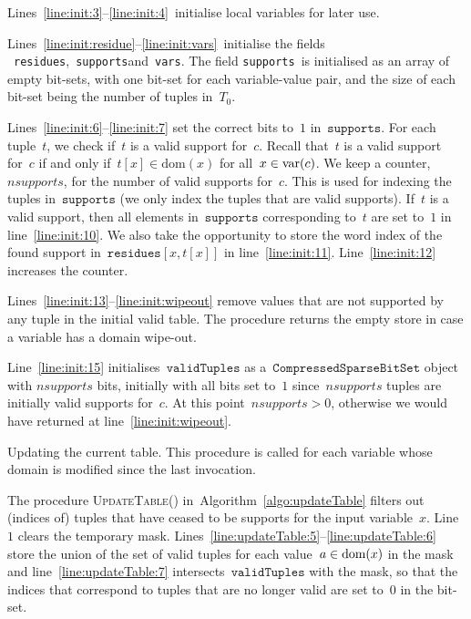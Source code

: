 \documentclass[a4paper,11pt]{article}
\theoremstyle{definition}
\newcommand{\Algoref}[1]{Algorithm~\ref{#1}}
\newcommand{\Lineref}[1]{Line~\ref{#1}}
\newcommand{\Linesref}[2]{Lines~\ref{#1}--\ref{#2}}
\newcommand{\lineref}[1]{line~\ref{#1}}
\newcommand{\Dom}[1]{\text{dom}({#1})}
\newcommand{\SparseBitSet}{\texttt{CompressedSparseBitSet}}
\newcommand{\CurrTable}{\texttt{validTuples}}
\newcommand{\Supports}{\texttt{supports}}
\newcommand{\Residues}{\texttt{residues}}
\newcommand{\Vars}{\texttt{vars}}
\def\UpdateTable{\textsc{Update\-Table}}
\newcommand{\localvar}[1]{\mathit{#1}}
\numberwithin{equation}{section}
\begin{document}
\Linesref{line:init:3}{line:init:4}~initialise local variables for later use.

\Linesref{line:init:residue}{line:init:vars}~initialise the fields
~\Residues,~\Supports and~\Vars.
The field \Supports~is initialised as an array of empty bit-sets,
with one bit-set for each
variable-value pair, and the size of each
bit-set being the number of tuples in~$T_0$.

\Linesref{line:init:6}{line:init:7} set the correct bits to~$1$ in~$\Supports$.
For each tuple~$t$, we check if~$t$ is a valid support for~$c$. Recall that~$t$ is
a valid support for~$c$ if and only if~$t[x] \in \Dom{x}$ for all~$x \in \text{var}(c)$.
We keep a counter,~$\mathit{nsupports}$, for the number of valid supports for~$c$.
This is used for indexing the tuples in~$\Supports$ (we only index the tuples
that are valid supports).
If~$t$ is a valid support, then
all elements in~$\Supports$ corresponding to~$t$ are set to~$1$ in
line~\ref{line:init:10}. We also take the opportunity to store the word index
of the found support in~$\Residues[x,t[x]]$
in line~\ref{line:init:11}.
Line~\ref{line:init:12} increases the counter.

\Linesref{line:init:13}{line:init:wipeout} remove values that are not supported
by any tuple in the initial valid table. The procedure returns the empty store
in case a variable has a domain wipe-out.

\Lineref{line:init:15} initialises~$\CurrTable$ as a~$\SparseBitSet$ object with
$\mathit{nsupports}$ bits, initially with all bits set to~$1$ since~$\mathit{nsupports}$
tuples are initially valid supports for~$c$.
At this point~$\localvar{nsupports} > 0$,
otherwise we would have returned at line~\ref{line:init:wipeout}.

  \begin{algorithm}[t]
  \begin{algorithmic}[1]  %
    
  \end{algorithmic}
  \caption{Updating the current table. This procedure is called for
    each variable whose domain is modified since the last invocation.}
  \label{algo:updateTable}
\end{algorithm}

\bigskip

  The procedure \UpdateTable() in~\Algoref{algo:updateTable}
  filters out (indices of)
  tuples that have ceased to be supports for the input variable~$x$.
  Line~$1$ clears the temporary mask.
  \Linesref{line:updateTable:5}{line:updateTable:6} store the union of the
  set of valid tuples for each value~$a \in \text{dom}(x)$ in the mask
  and \lineref{line:updateTable:7} intersects~$\CurrTable$ with the mask,
  so that the indices that correspond to tuples that are no longer valid
  are set to~$0$ in the bit-set.
\end{document}
